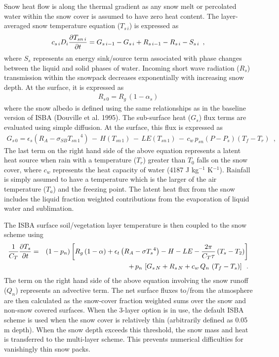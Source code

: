 Snow heat flow is along the thermal gradient
as any snow melt or percolated water within the snow cover
is assumed to have zero heat content.
The layer-averaged snow temperature equation
($T_{s\,i}$) is expressed as
%
\begin{eqnarray}
c_{s\,i} D_i {\partial T_{sn\,i}\over\partial t}
= G_{s\,i-1} - G_{s\,i} + R_{s\,i-1} - R_{s\,i}  - S_{s\,i}
\,\,\,,
\end{eqnarray}
%
where $S_s$ represents an energy sink/source term associated with
phase changes between the liquid and solid phases of water.
Incoming short wave radiation ($R_s$)
transmission within the snowpack decreases exponentially
with increasing snow depth. At the surface, it is expressed as
%
\begin{eqnarray}
R_{s\,0} = R_g \,\left(1-\alpha_s\right)
\end{eqnarray}
%
where the snow albedo is defined using the same relationships
as in the baseline version of ISBA (Douville et al. 1995).
The sub-surface heat ($G_s$) flux terms are evaluated using
simple diffusion. At the surface, this flux is expressed as
%
\begin{eqnarray}
G_{s\,0}
= \epsilon_s \left( R_A - \sigma_{SB} {T_{sn\,1}}^4 \right)
\,-\, H\left(T_{sn\,1}\right) \,-\, LE\left(T_{sn\,1}\right) \,-\,
c_w \,p_{sn} \left(P-P_s\right)\left(T_f-T_r\right)\,\,\,,
\end{eqnarray}
%
The last term on the right hand side of the above equation
represents a latent heat source when rain
with a temperature ($T_r$) greater than $T_0$ falls on the snow cover,
where $c_w$ represents the heat
capacity of water (4187 J kg$^{-1}$ K$^{-1}$).
Rainfall is simply assumed to have a temperature which is the larger of
the air temperature ($T_a$) and the freezing point.
The latent heat flux from the snow
includes the liquid fraction weighted
contributions from the
evaporation of liquid water and sublimation.

The ISBA surface soil/vegetation layer temperature is then
coupled to the snow scheme using
%
\begin{eqnarray}
{1\over C_T}{\partial T_s\over\partial t} &=&
\left(1-p_n\right) \left[R_g\left(1-\alpha\right) +
\epsilon_t\left(R_A-\sigma {T_s}^4\right)- H - LE
- {2\pi \over C_T \tau} \left(T_s-T_2\right)
\right] \\
%
& & \,+\, p_n \, \left[G_{s\,N}+R_{s\,N}
+ c_w\,Q_n\,\left(T_f-T_s\right)
\right] \,\,\,.
\end{eqnarray}
%
The term on the right hand side of the above equation
involving the snow runoff ($Q_n$) represents an advective term.
The net surface fluxes to/from the atmosphere
are then calculated as the snow-cover
fraction weighted sums over the snow and non-snow covered
surfaces. When the 3-layer option is in use, the default ISBA scheme
is used when the snow cover is relatively thin (arbitrarily
defined as 0.05 m depth). When the snow depth exceeds this
threshold, the snow mass and heat is transferred to the multi-layer
scheme. This prevents numerical difficulties
for vanishingly thin snow packs.

